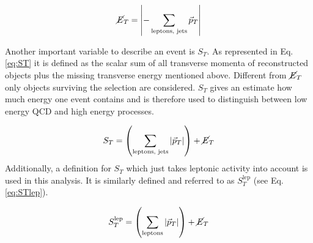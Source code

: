 	\begin{equation}
		\cancel{E}_T = \left| - \sum_{\textrm{leptons, jets}}^{} \vec{p}_T \right|
		\label{eq:MET}
	\end{equation}
	
	\noindent Another important variable to describe an event is $S_T$. As represented in Eq. \ref{eq:ST} it is defined as the scalar sum of all transverse momenta of reconstructed objects plus the missing transverse energy mentioned above. Different from $\cancel{E}_T$ only objects surviving the selection are considered. $S_T$ gives an estimate how much energy one event contains and is therefore used to distinguish between low energy QCD and high energy processes. 
	
	\begin{equation}
		S_T = \left( \sum_{\textrm{leptons, jets}}^{} \vert \vec{p}_T \vert \right) + \cancel{E}_T
		\label{eq:ST}
	\end{equation}
	\noindent Additionally, a definition for $S_T$ which just takes leptonic activity into account is used in this analysis. It is similarly defined and referred to as $S_T^{\text{lep}}$ (see Eq. \ref{eq:STlep}).
	
	\begin{equation}
		S_T^\text{lep} = \left( \sum_{\textrm{leptons}}^{} \vert \vec{p}_T \vert \right) + \cancel{E}_T
		\label{eq:STlep}
	\end{equation}	
